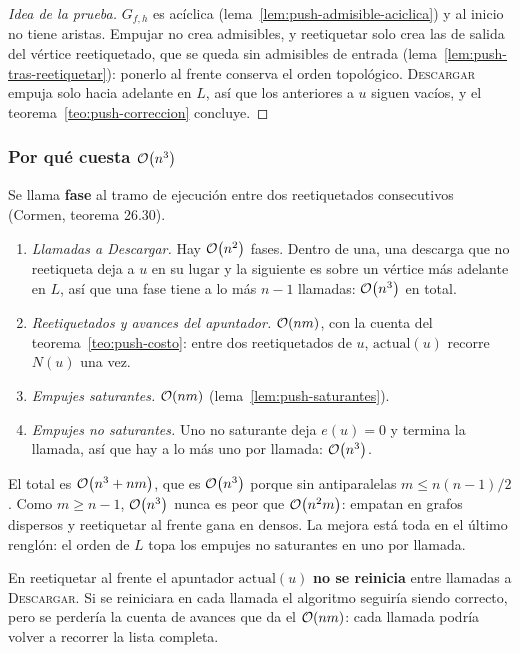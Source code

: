 \documentclass[11pt,letterpaper]{article}
\begin{document}
\begin{proof}[Idea de la prueba]
  $G_{f,h}$ es acíclica (lema~\ref{lem:push-admisible-aciclica}) y al
  inicio no tiene aristas. Empujar no crea admisibles, y reetiquetar
  solo crea las de salida del vértice reetiquetado, que se queda sin
  admisibles de entrada (lema~\ref{lem:push-tras-reetiquetar}):
  ponerlo al frente conserva el orden topológico. \textsc{Descargar}
  empuja solo hacia adelante en $L$, así que los anteriores a $u$
  siguen vacíos, y el teorema~\ref{teo:push-correccion} concluye.
\end{proof}

\subsubsection*{Por qué cuesta $\mathcal{O}\!\left(n^3\right)$}

Se llama \textbf{fase} al tramo de ejecución entre dos reetiquetados
consecutivos (Cormen, teorema 26.30).
\begin{enumerate}
  \item \emph{Llamadas a Descargar.} Hay $\mathcal{O}\!\left(n^2\right)$ fases. Dentro de
        una, una descarga que no reetiqueta deja a $u$ en su lugar y la
        siguiente es sobre un vértice más adelante en $L$, así que una
        fase tiene a lo más $n - 1$ llamadas: $\mathcal{O}\!\left(n^3\right)$ en total.
  \item \emph{Reetiquetados y avances del apuntador.} $\mathcal{O}\!\left(nm\right)$, con
        la cuenta del teorema~\ref{teo:push-costo}: entre dos
        reetiquetados de $u$, $\text{actual}(u)$ recorre $N(u)$ una
        vez.
  \item \emph{Empujes saturantes.} $\mathcal{O}\!\left(nm\right)$
        (lema~\ref{lem:push-saturantes}).
  \item \emph{Empujes no saturantes.} Uno no saturante deja
        $e(u) = 0$ y termina la llamada, así que hay a lo más uno por
        llamada: $\mathcal{O}\!\left(n^3\right)$.
\end{enumerate}
El total es $\mathcal{O}\!\left(n^3 + nm\right)$, que es $\mathcal{O}\!\left(n^3\right)$ porque sin
antiparalelas $m \le n(n - 1)/2$. Como $m \ge n - 1$, $\mathcal{O}\!\left(n^3\right)$ nunca
es peor que $\mathcal{O}\!\left(n^2 m\right)$: empatan en grafos dispersos y reetiquetar
al frente gana en densos. La mejora está toda en el último renglón: el
orden de $L$ topa los empujes no saturantes en uno por llamada.

\begin{ojo}
  En reetiquetar al frente el apuntador $\text{actual}(u)$
  \textbf{no se reinicia} entre llamadas a \textsc{Descargar}. Si se
  reiniciara en cada llamada el algoritmo seguiría siendo correcto,
  pero se perdería la cuenta de avances que da el $\mathcal{O}\!\left(nm\right)$: cada
  llamada podría volver a recorrer la lista completa.
\end{ojo}
\end{document}
